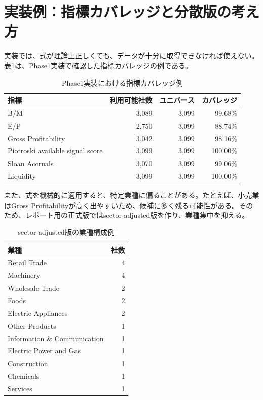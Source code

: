 \documentclass[11pt,a4paper]{article}
\begin{document}
\clearpage
\section{実装例：指標カバレッジと分散版の考え方}

実装では、式が理論上正しくても、データが十分に取得できなければ使えない。表\ref{tab:coverage}は、Phase1実装で確認した指標カバレッジの例である。

\begin{table}[tbp]
\caption{Phase1実装における指標カバレッジ例}
\label{tab:coverage}
\centering
\small
\begin{tabular}{lrrr}
\toprule
指標 & 利用可能社数 & ユニバース & カバレッジ \\
\midrule
B/M & 3,089 & 3,099 & 99.68\% \\
E/P & 2,750 & 3,099 & 88.74\% \\
Gross Profitability & 3,042 & 3,099 & 98.16\% \\
Piotroski available signal score & 3,099 & 3,099 & 100.00\% \\
Sloan Accruals & 3,070 & 3,099 & 99.06\% \\
Liquidity & 3,099 & 3,099 & 100.00\% \\
\bottomrule
\end{tabular}
\end{table}

また、式を機械的に適用すると、特定業種に偏ることがある。たとえば、小売業はGross Profitabilityが高く出やすいため、候補に多く残る可能性がある。そのため、レポート用の正式版ではsector-adjusted版を作り、業種集中を抑える。

\begin{table}[tbp]
\caption{sector-adjusted版の業種構成例}
\label{tab:sector-example}
\centering
\small
\begin{tabular}{lr}
\toprule
業種 & 社数 \\
\midrule
Retail Trade & 4 \\
Machinery & 4 \\
Wholesale Trade & 2 \\
Foods & 2 \\
Electric Appliances & 2 \\
Other Products & 1 \\
Information \& Communication & 1 \\
Electric Power and Gas & 1 \\
Construction & 1 \\
Chemicals & 1 \\
Services & 1 \\
\bottomrule
\end{tabular}
\end{table}
\end{document}
